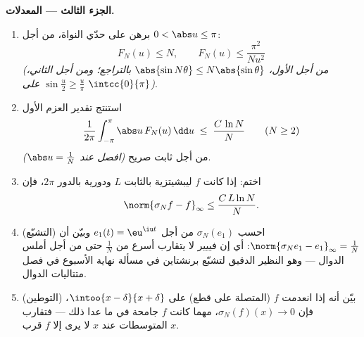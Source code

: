 \begin{problem}
\medskip
\noindent\textbf{الجزء الثالث --- المعدلات.}
\begin{enumerate}[resume]
  \item برهن على حدّي النواة، من أجل $0 < \abs u \leq
        \pi$:
        \[
        F_N(u) \leq N,
        \qquad
        F_N(u) \leq \frac{\pi^2}{N u^2}
        \]
        \emph{(من أجل الأول، $\abs{\sin N\theta} \leq
        N\abs{\sin\theta}$ بالتراجع؛ ومن أجل الثاني،
        $\sin\frac u2 \geq \frac{u}{\pi}$ على
        $\intcc{0}{\pi}$)}.
  \item استنتج تقدير العزم الأول
        \[
        \frac{1}{2\pi}\int_{-\pi}^{\pi}\abs u\,F_N(u)\,\dd u
        \;\leq\; \frac{C\,\ln N}{N}
        \qquad (N \geq 2)
        \]
        من أجل ثابت صريح \emph{(افصل عند $\abs u =
        \frac1N$)}.
  \item اختم: إذا كانت $f$ ليبشيتزية بالثابت $L$ ودورية بالدور $2\pi$،
        فإن
        \[
        \norm{\sigma_N f - f}_\infty \leq \frac{C\,L\ln N}{N} .
        \]
  \item (التشبّع) احسب $\sigma_N(e_1)$ من أجل $e_1(t) =
        \eu^{\iu t}$ وبيّن أن $\norm{\sigma_Ne_1 - e_1}_\infty
        = \frac1N$: أي إن فييير لا يتقارب أسرع من
        $\frac1N$ حتى من أجل أملس الدوال --- وهو النظير
        الدقيق لتشبّع برنشتاين في مسألة نهاية الأسبوع
        في فصل متتاليات الدوال.
  \item (التوطين) بيّن أنه إذا انعدمت $f$ (المتصلة على قطع)
        على $\intoo{x - \delta}{x + \delta}$، فإن
        $\sigma_N(f)(x) \to 0$، مهما كانت $f$ جامحة في ما عدا ذلك
        --- فتقارب المتوسطات عند $x$ لا يرى إلا $f$ قرب
        $x$.
\end{enumerate}


\end{problem}
